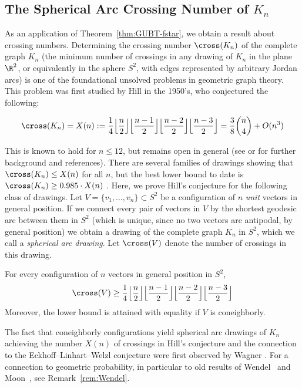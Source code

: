 \subsection{The Spherical Arc Crossing Number of $K_n$}
\label{subsec:crossing}
As an application of Theorem~\ref{thm:GUBT-fstar}, we obtain a result about crossing numbers. Determining the crossing number $\cross(K_n)$ of the complete graph $K_n$ (the minimum number of crossings in any drawing of $K_n$ in the plane $\R^2$, or equivalently in the sphere $S^2$, with edges represented by arbitrary Jordan arcs) is one of the foundational unsolved problems in geometric graph theory. This problem was first studied by Hill in the 1950's, who conjectured the following: 
\begin{conjecture}[Hill]
\begin{equation}
\label{conj:Hill}
\cross(K_n)=X(n):=\frac{1}{4}\Big\lfloor \frac{n}{2}\Big\rfloor \Big\lfloor \frac{n-1}{2} \Big\rfloor \Big\lfloor \frac{n-2}{2} \Big\rfloor \Big\lfloor \frac{n-3}{2}\Big\rfloor =\frac{3}{8}\binom{n}{4}+O(n^3)
\end{equation}
\end{conjecture}
This is known to hold for $n\leq 12$, but remains open in general (see \cite[Sec.~1.3]{Schaefer:2018aa} or \cite{Szekely:2016aa} for further background and references). There are several families of drawings showing that $\cross(K_n)\leq X(n)$ for all $n$, but the best lower bound to date is %
$\cross(K_n) \geq 0.985 \cdot X(n)$  \cite{Balogh:2019aa}.
%
Here, we prove Hill's conjecture for the following class of drawings. Let $V=\{v_1,\dots,v_n\} \subset S^2$ be a configuration of $n$ \emph{unit} vectors in general position. If we connect every pair of vectors in $V$ by the shortest geodesic arc between them in $S^2$ (which is unique, since no two vectors are antipodal, by general position) we obtain a drawing of the complete graph $K_n$ in $S^2$, which we call a \emph{spherical arc drawing}. Let 
$\cross(V)$ 
denote the number of crossings in this drawing.
\begin{theorem} 
\label{thm:crossings}
For every configuration of $n$ vectors in general position in $S^2$, 
\[\cross(V) \geq \frac{1}{4}\Big\lfloor \frac{n}{2}\Big\rfloor \Big\lfloor \frac{n-1}{2} \Big\rfloor \Big\lfloor \frac{n-2}{2} \Big\rfloor \Big\lfloor \frac{n-3}{2}\Big\rfloor
\]
Moreover, the lower bound is attained with equality if $V$ is coneighborly.
\end{theorem}
%
The fact that coneighborly configurations yield spherical arc drawings of $K_n$ achieving the number $X(n)$ of crossings in Hill's conjecture and the connection to the Eckhoff--Linhart--Welzl conjecture were first observed by Wagner \cite{Wagner:2006aa,Wagner:2008aa}. For a connection to geometric probability, in particular to old results of Wendel~\cite{Wendel:1962aa}  and Moon~\cite{Moon:1965aa}, see Remark~\ref{rem:Wendel}.
